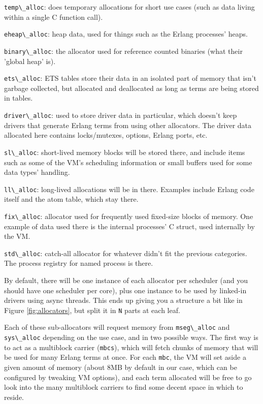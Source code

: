 \documentclass[11pt, oneside]{book}   	%
\newcommand{\var}[1]{\Verb`#1`}
\newcommand{\term}[1]{\Verb`#1`}
\begin{document}
\begin{enumerate*}
    \item \term{temp\_alloc}: does temporary allocations for short use cases (such as data living within a single C function call).
    \item \term{eheap\_alloc}: heap data, used for things such as the Erlang processes' heaps.
    \item \term{binary\_alloc}: the allocator used for reference counted binaries (what their 'global heap' is).
    \item \term{ets\_alloc}: ETS tables store their data in an isolated part of memory that isn't garbage collected, but allocated and deallocated as long as terms are being stored in tables.
    \item \term{driver\_alloc}: used to store driver data in particular, which doesn't keep drivers that generate Erlang terms from using other allocators. The driver data allocated here contains locks/mutexes, options, Erlang ports, etc.
    \item \term{sl\_alloc}: short-lived memory blocks will be stored there, and include items such as some of the VM's scheduling information or small buffers used for some data types' handling.
    \item \term{ll\_alloc}: long-lived allocations will be in there. Examples include Erlang code itself and the atom table, which stay there.
    \item \term{fix\_alloc}: allocator used for frequently used fixed-size blocks of memory. One example of data used there is the internal processes' C struct, used internally by the VM.
    \item \term{std\_alloc}: catch-all allocator for whatever didn't fit the previous categories. The process registry for named process is there.
\end{enumerate*}

By default, there will be one instance of each allocator per scheduler (and you should have one scheduler per core), plus one instance to be used by linked-in drivers using async threads. This ends up giving you a structure a bit like in Figure \ref{fig:allocators}, but split it in \var{N} parts at each leaf.

Each of these sub-allocators will request memory from \term{mseg\_alloc} and \term{sys\_alloc} depending on the use case, and in two possible ways. The first way is to act as a multiblock carrier (\term{mbcs}), which will fetch chunks of memory that will be used for many Erlang terms at once. For each \term{mbc}, the VM will set aside a given amount of memory (about 8MB by default in our case, which can be configured by tweaking VM options), and each term allocated will be free to go look into the many multiblock carriers to find some decent space in which to reside.
\end{document}
